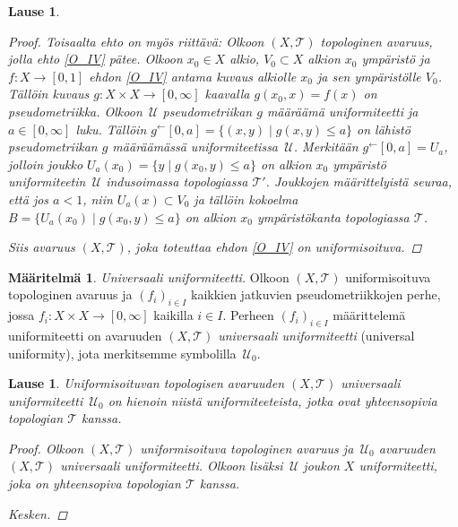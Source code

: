 \documentclass[12pt,a4paper,leqno]{report}
\newcommand{\U}{\,\mathcal{U}}
\newcommand{\T}{\mathcal{T}}
\theoremstyle{plain}
\newtheorem{lause}[equation]{Lause}
\theoremstyle{definition}
\newtheorem{maar}[equation]{Määritelmä}
\theoremstyle{remark}
\begin{document}
\begin{lause}
\begin{proof}
Toisaalta ehto on myös riittävä:
Olkoon $(X,\T)$ topologinen avaruus, jolla ehto \ref{O_IV} pätee. 
Olkoon $x_0\in X$ alkio, $V_0\subset X$ alkion $x_0$ ympäristö 
ja $f\colon X\rightarrow [0,1]$ ehdon \ref{O_IV} antama kuvaus alkiolle $x_0$ ja sen ympäristölle $V_0$. 
Tällöin kuvaus $g\colon X\times X\to [0,\infty]$ kaavalla $g(x_0,x)=f(x)$ on pseudometriikka. 
Olkoon $\U$ pseudometriikan $g$ määräämä uniformiteetti ja 
$ a\in [0,\infty]$ luku. 
Tällöin $g^\leftarrow[0,a]=\{(x,y)\mid g(x,y)\leq a\}$ on 
lähistö pseudometriikan $g$ määräämässä uniformiteetissa $\U$. 
Merkitään $g^\leftarrow[0,a]=U_a$, jolloin  
joukko $U_a(x_0)=\{y\mid g(x_0,y)\leq a\}$ on alkion $x_0$ ympäristö uniformiteetin $\U$ 
indusoimassa topologiassa $\T'$. 
Joukkojen määrittelyistä seuraa, että jos $a<1$, niin $U_a(x)\subset V_0$ ja tällöin kokoelma $B=\{U_a(x_0)\mid g(x_0,y)\leq a\}$ 
on alkion $x_0$ ympäristökanta topologiassa $\T$.
%

Siis avaruus $(X,\T)$, joka toteuttaa ehdon \ref{O_IV} on uniformisoituva.
\end{proof}
\end{lause}
\begin{maar}
\emph{Universaali uniformiteetti.} 
Olkoon $(X,\T)$ uniformisoituva topologinen avaruus ja 
$(f_i)_{i\in I}$ kaikkien jatkuvien pseudometriikkojen perhe, 
jossa $f_i\colon X\times X\rightarrow [0,\infty]$ 
kaikilla $i\in I$. 
Perheen $(f_i)_{i\in I}$ määrittelemä uniformiteetti on 
avaruuden $(X,\T)$ \emph{universaali uniformiteetti} (universal uniformity), 
jota merkitsemme symbolilla $\U_0$. 
\end{maar}
\begin{lause}
Uniformisoituvan topologisen avaruuden $(X,\T)$ universaali uniformiteetti $\U_0$ on hienoin niistä uniformiteeteista, jotka ovat yhteensopivia topologian $\T$ kanssa. 
\begin{proof}
Olkoon $(X,\T)$ uniformisoituva topologinen avaruus ja 
$\U_0$ avaruuden $(X,\T)$ universaali uniformiteetti. 
Olkoon lisäksi $\U$ joukon $X$ uniformiteetti, 
joka on yhteensopiva topologian $\T$ kanssa. 




Kesken.
\end{proof}
\end{lause}
\end{document}
